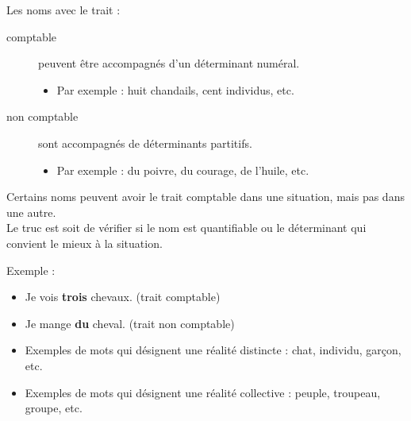 \documentclass[10pt, french]{article}
\begin{document}
\begin{multicols*}{2}
\begin{definitionNOHFILLpropos}
Les noms avec le trait : 
\begin{description}
	\item[comptable]	peuvent être accompagnés d'un déterminant numéral.
		\begin{itemize}
		\item	Par exemple : huit chandails, cent individus, etc.
		\end{itemize}
	\item[non comptable]	sont accompagnés de déterminants partitifs.
		\begin{itemize}
		\item	Par exemple : du poivre, du courage, de l'huile, etc.
		\end{itemize}
\end{description}

\begin{astuces}[Astuce]
Certains noms peuvent avoir le trait comptable dans une situation, mais pas dans une autre.\\
Le truc est soit de vérifier si le nom est quantifiable ou le déterminant qui convient le mieux à la situation.

\tcbline

Exemple :
\begin{itemize}
	\item	Je vois \textbf{trois} chevaux. (trait comptable)
	\item	Je mange \textbf{du} cheval. (trait non comptable)
\end{itemize}
\end{astuces}
\end{definitionNOHFILLpropos}

\begin{definitionNOHFILLpropos}
\begin{itemize}
	\item	Exemples de mots qui désignent une réalité distincte : chat, individu, garçon, etc.
	\item	Exemples de mots qui désignent une réalité collective : peuple, troupeau, groupe, etc.
\end{itemize}
\end{definitionNOHFILLpropos}


\end{multicols*}
\end{document}
